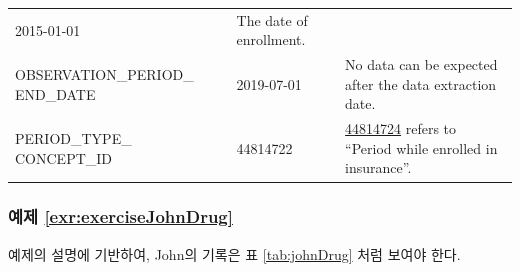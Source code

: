 \documentclass[10.5pt]{book}
\theoremstyle{definition}
\theoremstyle{definition}
\theoremstyle{definition}
\theoremstyle{remark}
\begin{document}
\begin{longtable}[]{@{}lll@{}}
\begin{minipage}[t]{0.14\columnwidth}
2015-01-01\strut
\end{minipage} & \begin{minipage}[t]{0.48\columnwidth}\raggedright\strut
The date of enrollment.\strut
\end{minipage}\tabularnewline
\begin{minipage}[t]{0.29\columnwidth}\raggedright\strut
OBSERVATION\_PERIOD\_ END\_DATE\strut
\end{minipage} & \begin{minipage}[t]{0.14\columnwidth}\raggedright\strut
2019-07-01\strut
\end{minipage} & \begin{minipage}[t]{0.48\columnwidth}\raggedright\strut
No data can be expected after the data extraction date.\strut
\end{minipage}\tabularnewline
\begin{minipage}[t]{0.29\columnwidth}\raggedright\strut
PERIOD\_TYPE\_ CONCEPT\_ID\strut
\end{minipage} & \begin{minipage}[t]{0.14\columnwidth}\raggedright\strut
44814722\strut
\end{minipage} & \begin{minipage}[t]{0.48\columnwidth}\raggedright\strut
\href{http://athena.ohdsi.org/search-terms/terms/44814722}{44814724}
refers to ``Period while enrolled in insurance''.\strut
\end{minipage}\tabularnewline
\bottomrule
\end{longtable}

\subsubsection*{예제
\ref{exr:exerciseJohnDrug}}\label{-refexrexercisejohndrug}

예제의 설명에 기반하여, John의 기록은 표 \ref{tab:johnDrug} 처럼 보여야
한다.
\end{document}
